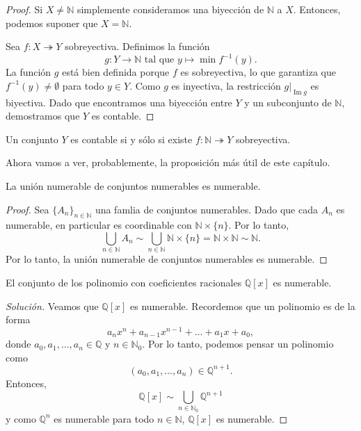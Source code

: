 \begin{proof}
	Si $X \neq \mathbb{N}$ simplemente consideramos una biyección de $\mathbb{N}$ a $X$. Entonces, podemos suponer que $X = \mathbb{N}$.

	Sea $f: X \twoheadrightarrow Y$ sobreyectiva. Definimos la función
	$$
		g: Y \to \mathbb{N} \text{ tal que } y \mapsto \min f^{-1}(y).
	$$
	La función $g$ está bien definida porque $f$ es sobreyectiva, lo que garantiza que $f^{-1}(y) \neq \emptyset$ para todo $y \in Y$. Como $g$ es inyectiva, la restricción $g|_{\operatorname{Im}g}$ es biyectiva. Dado que encontramos una biyección entre $Y$ y un subconjunto de $\mathbb{N}$, demostramos que $Y$ es contable.
\end{proof}

\begin{remark}
	Un conjunto $Y$ es contable si y sólo si existe $f : \mathbb{N} \twoheadrightarrow Y$ sobreyectiva.
\end{remark}

Ahora vamos a ver, probablemente, la proposición más útil de este capítulo.

\begin{proposition}
	La unión numerable de conjuntos numerables es numerable.
\end{proposition}

\begin{proof}
	Sea $\{ A_{n} \}_{n \in \mathbb{N}}$ una famlia de conjuntos numerables. Dado que cada $A_n$ es numerable, en particular es coordinable con $\mathbb{N} \times \{ n \}$. Por lo tanto,
	\begin{equation*}
		\bigcup_{n \in \mathbb{N}} A_n \sim \bigcup_{n \in \mathbb{N}} \mathbb{N} \times \{ n \} = \mathbb{N} \times \mathbb{N} \sim \mathbb{N}.
	\end{equation*}
	Por lo tanto, la unión numerable de conjuntos numerables es numerable.
\end{proof}

\begin{example}
	El conjunto de los polinomio con coeficientes racionales $\mathbb{Q}[x]$ es numerable.
\end{example}

\begin{proof}[Solución]
	Veamos que $\mathbb{Q}[x]$ es numerable. Recordemos que un polinomio es de la forma
	\begin{equation*}
		a_{n} x^n + a_{n-1} x^{n-1} + \dots + a_{1} x + a_0,
	\end{equation*}
	donde $a_0, a_1, \ldots, a_n \in \mathbb{Q}$ y $n \in \mathbb{N}_0$. Por lo tanto, podemos pensar un polinomio como
	\begin{equation*}
		(a_0, a_1, \ldots, a_n) \in \mathbb{Q}^{n+1}.
	\end{equation*}
	Entonces,
	\begin{equation*}
		\mathbb{Q}[x] \sim \bigcup_{n \in \mathbb{N}_0} \mathbb{Q}^{n+1}
	\end{equation*}
	y como $\mathbb{Q}^n$ es numerable para todo $n \in \mathbb{N}$, $\mathbb{Q}[x]$ es numerable.
\end{proof}

